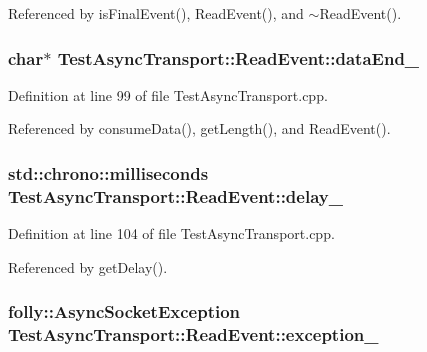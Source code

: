 Referenced by is\+Final\+Event(), Read\+Event(), and $\sim$\+Read\+Event().

\subsubsection[{data\+End\+\_\+}]{\setlength{\rightskip}{0pt plus 5cm}char$\ast$ Test\+Async\+Transport\+::\+Read\+Event\+::data\+End\+\_\+\hspace{0.3cm}{\ttfamily [private]}}\label{classTestAsyncTransport_1_1ReadEvent_ac25c99bf2d0fa85dee77b1438ba15ef3}


Definition at line 99 of file Test\+Async\+Transport.\+cpp.



Referenced by consume\+Data(), get\+Length(), and Read\+Event().

\subsubsection[{delay\+\_\+}]{\setlength{\rightskip}{0pt plus 5cm}std\+::chrono\+::milliseconds Test\+Async\+Transport\+::\+Read\+Event\+::delay\+\_\+\hspace{0.3cm}{\ttfamily [private]}}\label{classTestAsyncTransport_1_1ReadEvent_afed1d8a3f1bb440075891a285bd138f3}


Definition at line 104 of file Test\+Async\+Transport.\+cpp.



Referenced by get\+Delay().

\subsubsection[{exception\+\_\+}]{\setlength{\rightskip}{0pt plus 5cm}folly\+::\+Async\+Socket\+Exception Test\+Async\+Transport\+::\+Read\+Event\+::exception\+\_\+\hspace{0.3cm}{\ttfamily [private]}}\label{classTestAsyncTransport_1_1ReadEvent_ad35771fd6c6959dc7ada3832f984650f}


